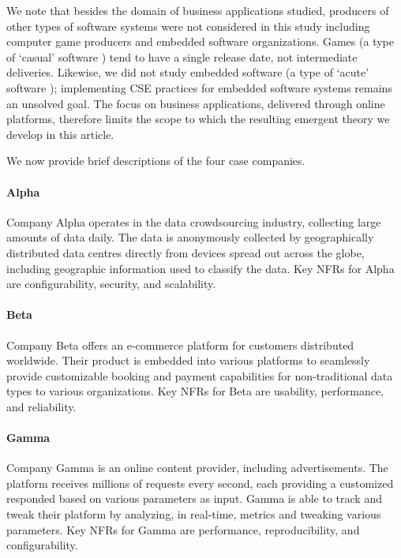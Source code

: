 \documentclass[smallextended]{svjour3}       %
\begin{document}
We note that besides the domain of business applications studied, producers of other types of software systems were not considered in this study including computer game producers and embedded software organizations. Games (a type of `casual' software \citep{meyer2013}) tend to have a single release date, not intermediate deliveries. Likewise, we did not study embedded software (a type of `acute' software \citep{meyer2013}); implementing CSE practices for embedded software systems remains an unsolved goal. The focus on business applications, delivered through online platforms, therefore limits the scope to which the resulting emergent theory we develop in this article. 

We now provide brief descriptions of the four case companies.

\paragraph{Alpha}
Company Alpha operates in the data crowdsourcing industry, collecting large amounts of data daily. The data is anonymously collected by geographically distributed data centres directly from devices spread out across the globe, including geographic information used to classify the data. Key NFRs for Alpha are configurability, security, and scalability. 

\paragraph{Beta}
Company Beta offers an e-commerce platform for customers distributed worldwide. Their product is embedded into various platforms to seamlessly provide customizable booking and payment capabilities for non-traditional data types to various organizations. Key NFRs for Beta are usability, performance, and reliability.



\paragraph{Gamma}
Company Gamma is an online content provider, including advertisements. The platform receives millions of requests every second, each providing a customized responded based on various parameters as input. Gamma is able to track and tweak their platform by analyzing, in real-time, metrics and tweaking various parameters. Key NFRs for Gamma are performance, reproducibility, and configurability. 
\end{document}
